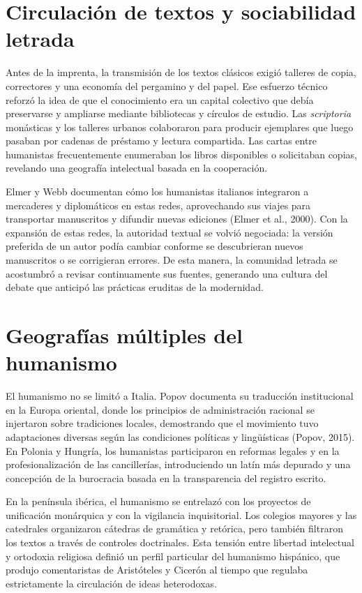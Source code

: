 \section{Circulación de textos y sociabilidad letrada}
Antes de la imprenta, la transmisión de los textos clásicos exigió talleres de copia, correctores y una economía del pergamino y del papel. Ese esfuerzo técnico reforzó la idea de que el conocimiento era un capital colectivo que debía preservarse y ampliarse mediante bibliotecas y círculos de estudio. Las \emph{scriptoria} monásticas y los talleres urbanos colaboraron para producir ejemplares que luego pasaban por cadenas de préstamo y lectura compartida. Las cartas entre humanistas frecuentemente enumeraban los libros disponibles o solicitaban copias, revelando una geografía intelectual basada en la cooperación.

Elmer y Webb documentan cómo los humanistas italianos integraron a mercaderes y diplomáticos en estas redes, aprovechando sus viajes para transportar manuscritos y difundir nuevas ediciones (Elmer et al., 2000). Con la expansión de estas redes, la autoridad textual se volvió negociada: la versión preferida de un autor podía cambiar conforme se descubrieran nuevos manuscritos o se corrigieran errores. De esta manera, la comunidad letrada se acostumbró a revisar continuamente sus fuentes, generando una cultura del debate que anticipó las prácticas eruditas de la modernidad.

\section{Geografías múltiples del humanismo}
El humanismo no se limitó a Italia. Popov documenta su traducción institucional en la Europa oriental, donde los principios de administración racional se injertaron sobre tradiciones locales, demostrando que el movimiento tuvo adaptaciones diversas según las condiciones políticas y lingüísticas (Popov, 2015). En Polonia y Hungría, los humanistas participaron en reformas legales y en la profesionalización de las cancillerías, introduciendo un latín más depurado y una concepción de la burocracia basada en la transparencia del registro escrito.

En la península ibérica, el humanismo se entrelazó con los proyectos de unificación monárquica y con la vigilancia inquisitorial. Los colegios mayores y las catedrales organizaron cátedras de gramática y retórica, pero también filtraron los textos a través de controles doctrinales. Esta tensión entre libertad intelectual y ortodoxia religiosa definió un perfil particular del humanismo hispánico, que produjo comentaristas de Aristóteles y Cicerón al tiempo que regulaba estrictamente la circulación de ideas heterodoxas.

